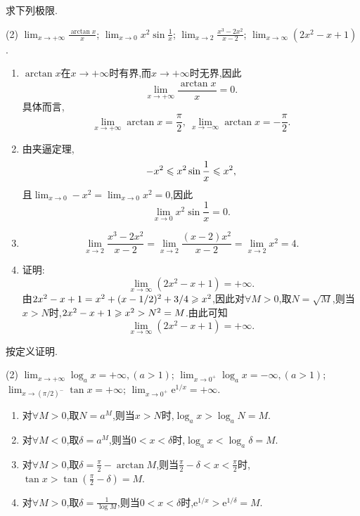 \begin{exercise}[1.3.10]
    求下列极限.
    \begin{tasks}[label=(\arabic*)](2)
        \task $\lim_{x \to +\infty} \frac{\arctan x}{x}$;
        \task $\lim_{x \to 0} x^2 \sin\frac{1}{x}$;
        \task $\lim_{x \to 2} \frac{x^3-2x^2}{x-2}$;
        \task $\lim_{x \to \infty} (2x^2 - x + 1)$.
    \end{tasks}
\end{exercise}

\begin{solution}
    \begin{enumerate}[(1)]
        \item $\arctan x$在$x \to +\infty$时有界,而$x \to +\infty$时无界,因此$$\lim_{x \to +\infty} \frac{\arctan x}{x} = 0.$$具体而言,$$\lim_{x \to + \infty} \arctan x = \frac{\pi}{2} , \ \lim_{x \to -\infty} \arctan x = -\frac{\pi}{2}.$$
        \item 由夹逼定理,$$-x^2 \leqslant x^2 \sin \frac{1}{x} \leqslant x^2,$$且$\lim_{x \to 0} -x^2 = \lim_{x \to 0} x^2 = 0$,因此$$\lim_{x \to 0} x^2 \sin\frac{1}{x} = 0.$$
        \item $$\lim_{x \to 2} \frac{x^3-2x^2}{x-2} = \lim_{x \to 2} \frac{(x-2)x^2}{x-2} = \lim_{x \to 2}x^2  = 4.$$
        \item 证明: $$\lim_{x \to \infty} (2x^2 - x + 1) = +\infty.$$
              由$2x^2 - x + 1 = x^2 + (x - 1/2)^2 + 3/4 \geqslant x^2$,因此对$\forall M > 0$,取$N = \sqrt{M}$,则当$x > N$时,$2x^2 - x + 1 \geqslant x^2 > N^2 = M$.由此可知$$\lim_{x \to \infty} (2x^2 - x + 1) = +\infty.$$
    \end{enumerate}
\end{solution}

\begin{exercise}[1.3.11]
    按定义证明.
    \begin{tasks}[label=(\arabic*)](2)
        \task $\lim_{x \to +\infty} \log_a x = +\infty, (a > 1)$;
        \task $\lim_{x \to 0^+} \log_a x = -\infty, (a > 1)$;
        \task $\lim_{x \to (\pi/2)^-} \tan x = +\infty$;
        \task $\lim_{x \to 0^+} \mathrm{e}^{1/x} = +\infty$.
    \end{tasks}
\end{exercise}

\begin{solution}
    \begin{enumerate}[(1)]
        \item 对$\forall M > 0$,取$N = a^M$,则当$x > N$时,$\log_a x > \log_a N = M$.
        \item 对$\forall M < 0$,取$\delta = a^M$,则当$0 < x < \delta$时,$\log_a x < \log_a \delta = M$.
        \item 对$\forall M > 0$,取$\delta = \frac{\pi}{2} - \arctan M$,则当$\frac{\pi}{2} - \delta < x < \frac{\pi}{2}$时,$\tan x > \tan(\frac{\pi}{2} - \delta) = M$.
        \item 对$\forall M > 0$,取$\delta = \frac{1}{\log M}$,则当$0 < x < \delta$时,$\mathrm{e}^{1/x} > \mathrm{e}^{1/\delta} = M$.
    \end{enumerate}
\end{solution}


